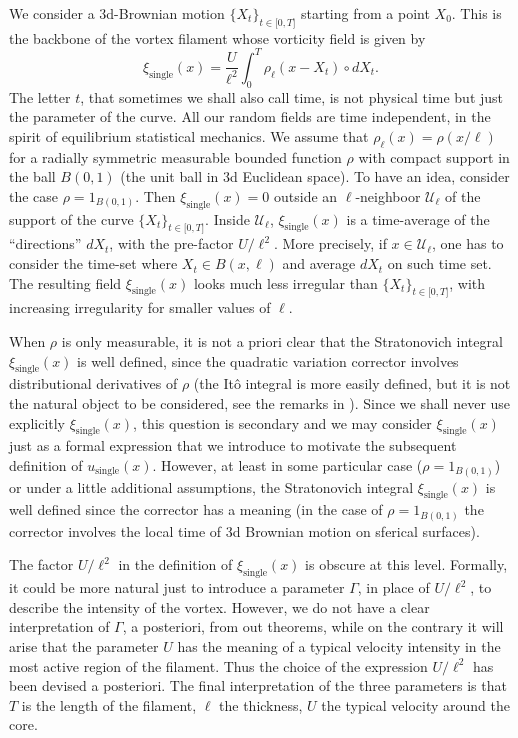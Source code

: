 \documentclass[a4paper,12pt]{article}
\begin{document}
We consider a 3d-Brownian motion $\{X_{t}\}_{t\in\lbrack0,T]}$ starting from a
point $X_{0}$. This is the backbone of the vortex filament whose vorticity
field is given by
\begin{equation}
\xi_{\text{single}}(x)=\frac{U}{\ell^{2}}\int_{0}^{T}\rho_{\ell}(x-X_{t})\circ
dX_{t}.
\end{equation}
The letter $t$, that sometimes we shall also call time, is not physical time
but just the parameter of the curve. All our random fields are time
independent, in the spirit of equilibrium statistical mechanics. We assume
that $\rho_{\ell}(x)=\rho(x/\ell)$ for a radially symmetric measurable bounded
function $\rho$ with compact support in the ball $B(0,1)$ (the unit ball in 3d
Euclidean space). To have an idea, consider the case $\rho=1_{B(0,1)}$. Then
$\xi_{\text{single}}(x)=0$ outside an $\ell$-neighboor $\mathcal{U}_{\ell}$ of
the support of the curve $\{X_{t}\}_{t\in\lbrack0,T]}$. Inside $\mathcal{U}%
_{\ell}$, $\xi_{\text{single}}(x)$ is a time-average of the ``directions''
$dX_{t}$, with the pre-factor ${U}/{\ell^{2}}$. More precisely, if
$x\in\mathcal{U}_{\ell}$, one has to consider the time-set where $X_{t}\in
B(x,\ell)$ and average $dX_{t}$ on such time set. The resulting field
$\xi_{\text{single}}(x)$ looks much less irregular than $\{X_{t}%
\}_{t\in\lbrack0,T]}$, with increasing irregularity for smaller values of
$\ell$.

When $\rho$ is only measurable, it is not a priori clear that the Stratonovich
integral $\xi_{\text{single}}(x)$ is well defined, since the quadratic
variation corrector involves distributional derivatives of $\rho$ (the It\^{o}
integral is more easily defined, but it is not the natural object to be
considered, see the remarks in \cite{Fl1}). Since we shall never use
explicitly $\xi_{\text{single}}(x)$, this question is secondary and we may
consider $\xi_{\text{single}}(x)$ just as a formal expression that we
introduce to motivate the subsequent definition of $u_{\text{single}}(x)$.
However, at least in some particular case ($\rho=1_{B(0,1)}$) or under a
little additional assumptions, the Stratonovich integral $\xi_{\text{single}%
}(x)$ is well defined since the corrector has a meaning (in the case of
$\rho=1_{B(0,1)}$ the corrector involves the local time of 3d Brownian motion
on sferical surfaces).

The factor ${U}/{\ell^{2}}$ in the definition of $\xi_{\text{single}}(x)$ is
obscure at this level. Formally, it could be more natural just to introduce a
parameter $\Gamma$, in place of ${U}/{\ell^{2}}$, to describe the intensity of
the vortex. However, we do not have a clear interpretation of $\Gamma$, a
posteriori, from out theorems, while on the contrary it will arise that the
parameter $U$ has the meaning of a typical velocity intensity in the most
active region of the filament. Thus the choice of the expression ${U}%
/{\ell^{2}}$ has been devised a posteriori. The final interpretation of the
three parameters is that $T$ is the length of the filament, $\ell$ the
thickness, $U$ the typical velocity around the core.
\end{document}
